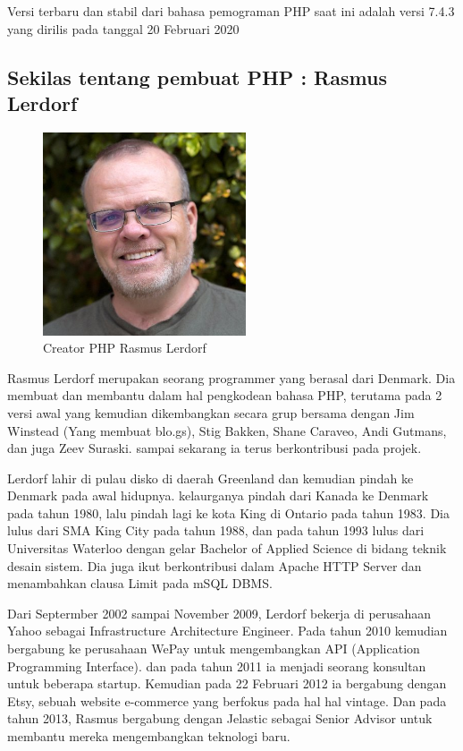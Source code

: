 \begin{enumerate}
Versi terbaru dan stabil dari bahasa pemograman PHP saat ini adalah versi 7.4.3 yang dirilis pada tanggal 20 Februari 2020

\subsection{Sekilas tentang pembuat PHP : Rasmus Lerdorf}
	\begin{figure}[H]
		\includegraphics[width=6cm]{figures/web/rasmuslerdorf.jpg}
		\centering
		\caption{Creator PHP Rasmus Lerdorf }
	\end{figure}
Rasmus Lerdorf merupakan seorang programmer yang berasal dari Denmark. Dia membuat dan membantu dalam hal pengkodean bahasa PHP, terutama pada 2 versi awal yang kemudian dikembangkan secara grup bersama dengan Jim Winstead (Yang membuat blo.gs), Stig Bakken, Shane Caraveo, Andi Gutmans, dan juga Zeev Suraski. sampai sekarang ia terus berkontribusi pada projek.

Lerdorf lahir di pulau disko di daerah Greenland dan kemudian pindah ke Denmark pada awal hidupnya. kelaurganya pindah dari Kanada ke Denmark pada tahun 1980, lalu pindah lagi ke kota King di Ontario pada tahun 1983. Dia lulus dari SMA King City pada tahun 1988, dan pada tahun 1993 lulus dari Universitas Waterloo dengan gelar  Bachelor of Applied Science di bidang teknik desain sistem. Dia juga ikut berkontribusi dalam Apache HTTP Server dan menambahkan clausa Limit pada mSQL DBMS. 

Dari Septermber 2002 sampai November 2009, Lerdorf bekerja di perusahaan Yahoo sebagai Infrastructure Architecture Engineer. Pada tahun 2010 kemudian bergabung ke perusahaan WePay untuk mengembangkan API (Application Programming Interface). dan pada tahun 2011 ia menjadi seorang konsultan untuk beberapa startup. Kemudian pada 22 Februari 2012 ia bergabung dengan Etsy, sebuah website e-commerce yang berfokus pada hal hal vintage. Dan pada tahun 2013, Rasmus bergabung dengan Jelastic sebagai Senior Advisor untuk membantu mereka mengembangkan teknologi baru.


\end{enumerate}
